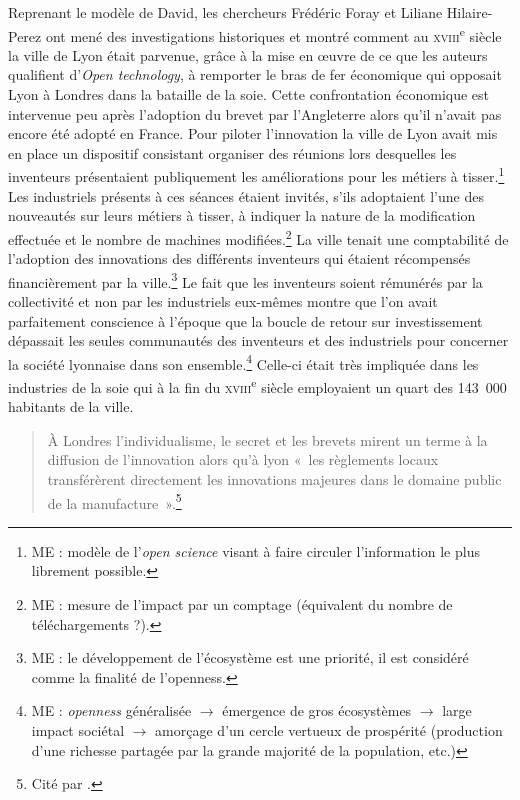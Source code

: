 \documentclass{FramateX}
\begin{document}
\begin{refsection}
Reprenant le modèle de David, les chercheurs Frédéric Foray et Liliane
Hilaire-Perez ont mené des investigations historiques et montré comment
au \textsc{xviii}\textsuperscript{e} siècle la ville de Lyon était parvenue,
grâce à la mise en œuvre de ce que les auteurs qualifient
d'\textit{Open technology}, à remporter le bras de fer économique qui
opposait Lyon à Londres dans la bataille de la soie. Cette
confrontation économique est intervenue peu après l'adoption du brevet
par l'Angleterre alors qu'il n'avait pas encore été adopté en France.
Pour piloter l'innovation la ville de Lyon avait mis en place un
dispositif consistant organiser des réunions lors desquelles les
inventeurs présentaient publiquement les améliorations pour les métiers
à tisser.\footnote{ME : modèle de l'\textit{open
science} visant à faire circuler l'information le plus
librement possible.} Les industriels présents à ces séances étaient
invités, s'ils adoptaient l'une des nouveautés sur leurs métiers à
tisser, à indiquer la nature de la modification effectuée et le nombre
de machines modifiées.\footnote{ME : mesure de
l'impact par un comptage (équivalent du nombre de
téléchargements ?).} La ville tenait une comptabilité de l'adoption des
innovations des différents inventeurs qui étaient récompensés
financièrement par la ville.\footnote{ME : le développement de
l'écosystème est une priorité, il est considéré comme
la finalité de l'openness.} Le fait que les inventeurs
soient rémunérés par la collectivité et non par les industriels
eux-mêmes montre que l'on avait parfaitement conscience à l'époque que
la boucle de retour sur investissement dépassait les seules communautés
des inventeurs et des industriels pour concerner la société lyonnaise
dans son ensemble.\footnote{ME : \textit{openness} généralisée $\rightarrow$
émergence de gros écosystèmes $\rightarrow$ large impact sociétal $\rightarrow$ amorçage d'un cercle vertueux de prospérité (production
d'une richesse partagée par la grande majorité de la
population, etc.)} Celle-ci était très impliquée dans les industries de
la soie qui à la fin du \textsc{xviii}\textsuperscript{e} siècle employaient un
quart des 143~000 habitants de la ville.

\begin{quote}
À Londres l'individualisme, le secret et les brevets mirent un terme à la
diffusion de l'innovation alors qu'à lyon «~les règlements locaux
transférèrent directement les innovations majeures dans le domaine
public de la manufacture~».\footnote{Cité par \cite{Foray2005}.}
\end{quote}


\end{refsection}
\end{document}
